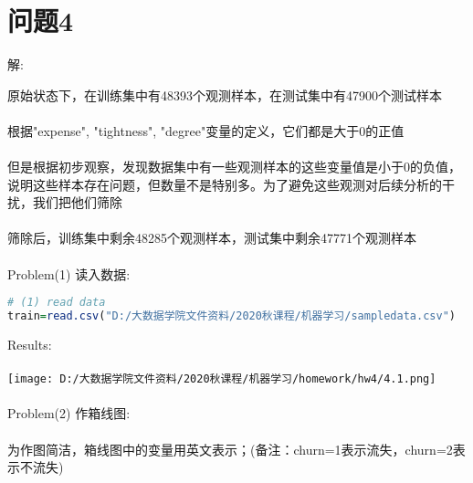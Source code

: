 \documentclass[]{article}
\begin{document}
\section{问题4}
\begin{flushleft}
	解:
\end{flushleft}
原始状态下，在训练集中有48393个观测样本，在测试集中有47900个测试样本\\\\
根据"expense", "tightness", "degree"变量的定义，它们都是大于0的正值\\\\
但是根据初步观察，发现数据集中有一些观测样本的这些变量值是小于0的负值，说明这些样本存在问题，但数量不是特别多。为了避免这些观测对后续分析的干扰，我们把他们筛除\\\\
筛除后，训练集中剩余48285个观测样本，测试集中剩余47771个观测样本\\\\
Problem(1) 读入数据:
\begin{lstlisting}[language=R]
# (1) read data
train=read.csv("D:/大数据学院文件资料/2020秋课程/机器学习/sampledata.csv")
\end{lstlisting}
Results:\\\\
\texttt{[image: D:/大数据学院文件资料/2020秋课程/机器学习/homework/hw4/4.1.png]}\\\\
Problem(2) 作箱线图:\\\\
为作图简洁，箱线图中的变量用英文表示；(备注：churn=1表示流失，churn=2表示不流失)
\end{document}

